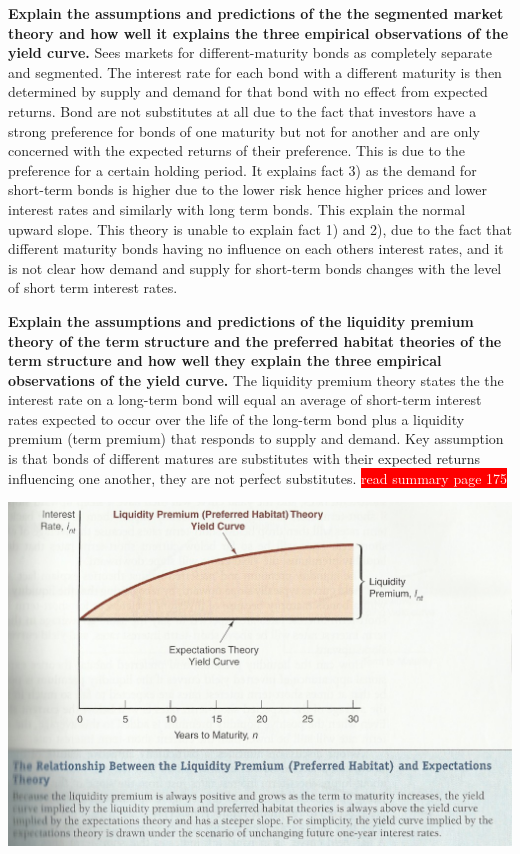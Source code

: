 \documentclass[12pt]{examnotes}
\begin{document}
\textbf{Explain the assumptions and predictions of the the segmented market theory and how well it explains the three empirical observations of the yield curve.}
Sees markets for different-maturity bonds as completely separate and segmented. The interest rate for each bond with a different maturity is then determined by supply and demand for that bond with no effect from expected returns. Bond are not substitutes at all due to the fact that investors have a strong preference for bonds of one maturity but not for another and are only concerned with the expected returns of their preference. This is due to the preference for a certain holding period. It explains fact 3) as the demand for short-term bonds is higher due to the lower risk hence higher prices and lower interest rates and similarly with long term bonds. This explain the normal upward slope. This theory is unable to explain fact 1) and 2), due to the fact that different maturity bonds having no influence on each others interest rates, and it is not clear how demand and supply for short-term bonds changes with the level of short term interest rates. 

\textbf{Explain the assumptions and predictions of the liquidity premium theory of the term structure and the preferred habitat theories of the term structure and how well they explain the three empirical observations of the yield curve.}
The liquidity premium theory states the the interest rate on a long-term bond will equal an average of short-term interest rates expected to occur over the life of the long-term bond plus a liquidity premium (term premium) that responds to supply and demand. Key assumption is that bonds of different matures are substitutes with their expected returns influencing one another, they are not perfect substitutes.
\colorbox{red}{\textcolor{white}{read summary page 175}}
\begin{center}
  \includegraphics[scale=0.5]{./imgs/c6f5.jpg}
\end{center}
\end{document}
